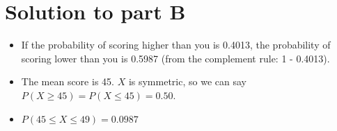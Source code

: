 		\section*{Solution to part B}
\begin{itemize}	
\item If the probability of scoring higher than you is 0.4013, the probability of scoring lower than you is 0.5987  
	(from the complement rule: 1 - 0.4013).
\item The mean score is 45. $X$ is symmetric, so we can say $P(X \geq 45) = P(X \leq 45) = 0.50$.
\item $P(45 \leq X \leq 49) = 0.0987$
\end{itemize}	
	

	
	
